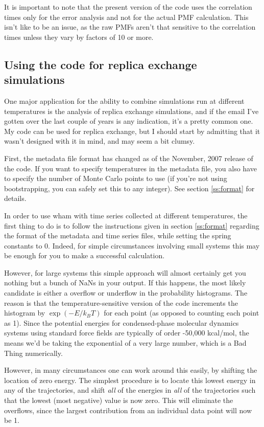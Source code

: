 \documentclass[12pt]{article}
\begin{document}
It is important to note that the present version of the code uses the
correlation times only for the error analysis and not for the actual PMF
calculation.  This isn't like to be an issue, as the raw PMFs aren't that
sensitive to the correlation times unless they vary by factors of 10 or more.  


\subsection{Using the code for replica exchange simulations}
\label{ss:repex}

One major application for the ability to combine simulations run at different
temperatures is the analysis of replica exchange simulations, and if the
email I've gotten over the last couple of years is any indication, it's a
pretty common one.  My code can be used for replica exchange, but I should
start by admitting that it wasn't designed with it in mind, and may seem a
bit clumsy.  

First, the metadata file format has changed as of the November, 2007 release
of the code.  If you want to specify temperatures in the metadata file, you
also have to specify the number of Monte Carlo points to use (if you're not
using bootstrapping, you can safely set this to any integer).  See section
\ref{ss:format} for details.

In order to use wham with time series collected at different temperatures,
the first thing to do is to follow the instructions given in section
\ref{ss:format} regarding the format of the metadata and time series files,
while setting the spring constants to 0.  Indeed, for simple circumstances
involving small systems this may be enough for you to make a successful
calculation.  

However, for large systems this simple approach will almost certainly get you
nothing but a bunch of NaNs in your output.  If this happens, the most likely
candidate is either a overflow or underflow in the probability histograms.
The reason is that the temperature-sensitive version of the code increments
the histogram by $\exp(-E/k_B T)$ for each point (as opposed to counting each
point as 1).  Since the potential energies for condensed-phase
molecular dynamics systems using standard force fields are typically of order
-50,000 kcal/mol, the means we'd be taking the exponential of a very large
number, which is a Bad Thing numerically.  

However, in many circumstances one can work around this easily, by shifting
the location of zero energy.  The simplest procedure is to locate this lowest
energy in any of the trajectories, and shift \emph{all} of the energies in
\emph{all} of the trajectories such that the lowest (most negative) value is
now zero.  This will eliminate the overflows, since the largest contribution
from an individual data point will now be 1.  
\end{document}

